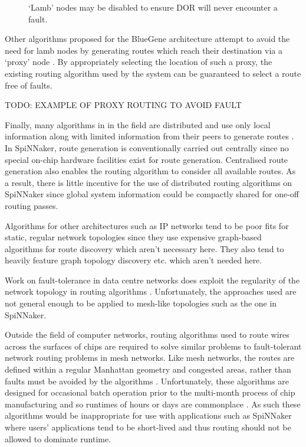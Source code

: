 			\begin{figure}
				\center
				
				\caption{`Lamb' nodes may be disabled to ensure DOR will never
				encounter a fault.}
				\label{fig:lamb-nodes}
			\end{figure}
			
			Other algorithms proposed for the BlueGene architecture attempt to avoid
			the need for lamb nodes by generating routes which reach their destination
			via a `proxy' node \cite{gomez04}. By appropriately selecting the location
			of such a proxy, the existing routing algorithm used by the system can be
			guaranteed to select a route free of faults.
			
			TODO: EXAMPLE OF PROXY ROUTING TO AVOID FAULT
			
			Finally, many algorithms in in the field are distributed and use only local
			information along with limited information from their peers to generate
			routes \cite{fick09b}. In SpiNNaker, route generation is conventionally
			carried out centrally since no special on-chip hardware facilities exist
			for route generation. Centralised route generation also enables the routing
			algorithm to consider all available routes. As a result, there is little
			incentive for the use of distributed routing algorithms on SpiNNaker since
			global system information could be compactly shared for one-off routing
			passes.
			
			Algorithms for other architectures such as IP networks tend to be poor fits
			for static, regular network topologies since they use expensive graph-based
			algorithms for route discovery which aren't necessary here. They also tend
			to heavily feature graph topology discovery etc. which aren't needed here.
			
			Work on fault-tolerance in data centre networks does exploit the regularity
			of the network topology in routing algorithms \cite{guo08,liao12}.
			Unfortunately, the approaches used are not general enough to be applied to
			mesh-like topologies such as the one in SpiNNaker.
			
			Outside the field of computer networks, routing algorithms used to route
			wires across the surfaces of chips are required to solve similar problems
			to fault-tolerant network routing problems in mesh networks. Like mesh
			networks, the routes are defined within a regular Manhattan geometry and
			congested areas, rather than faults must be avoided by the algorithms
			\cite{kahng11}.  Unfortunately, these algorithms are designed for
			occasional batch operation prior to the multi-month process of chip
			manufacturing and so runtimes of hours or days are commonplace
			\cite{nam08}. As such these algorithms would be inappropriate for use
			with applications such as SpiNNaker where users' applications tend to be
			short-lived and thus routing should not be allowed to dominate runtime.
	
